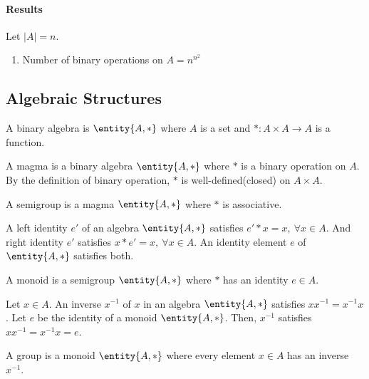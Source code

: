 \paragraph{Results}
Let $|A|=n$.
\begin{enumerate}
	\item Number of binary operations on $A = n^{n^2}$
\end{enumerate}

\subsection{Algebraic Structures}
\begin{definition}[algebra]
	A binary algebra is $\entity{A,\ast}$ where $A$ is a set and $\ast : A \times A \to A$ is a function.
\end{definition}

\begin{definition}[magma]
	A magma is a binary algebra $\entity{A,\ast}$ where $\ast$ is a binary operation on $A$.
	By the definition of binary operation, $\ast$ is well-defined(closed) on $A \times A$.
\end{definition}

\begin{definition}[semigroup]
	A semigroup is a magma $\entity{A,\ast}$ where $\ast$ is associative.
\end{definition}

\begin{definition}[identity]
	A left identity $e'$ of an algebra $\entity{A,\ast}$ satisfies $e' \ast x = x,\ \forall x \in A$.
	And right identity $e'$ satisfies $x \ast e' = x,\ \forall x \in A$.
	An identity element $e$ of $\entity{A,\ast}$ satisfies both.
\end{definition}

\begin{definition}[monoid]
	A monoid is a semigroup $\entity{A,\ast}$ where $\ast$ has an identity $e \in A$.
\end{definition}

\begin{definition}[inverse]
	Let $x \in A$.
	An inverse $x^{-1}$ of $x$ in an algebra $\entity{A,\ast}$ satisfies $xx^{-1} = x^{-1}x$.
	Let $e$ be the identity of a monoid $\entity{A,\ast}$.
	Then, $x^{-1}$ satisfies $xx^{-1} = x^{-1}x = e$.	
\end{definition}

\begin{definition}[group]
	A group is a monoid $\entity{A,\ast}$ where every element $x \in A$ has an inverse $x^{-1}$.
\end{definition}


